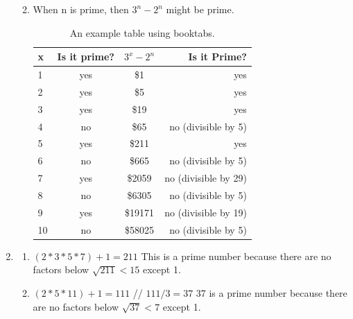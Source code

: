 \documentclass[12pt]{exam}
\begin{document}
\begin{enumerate}
\begin{enumerate}
\begin{table}[h]
\begin{tabular}{lccr}
        \bottomrule
    \end{tabular}
\end{table}



    \item When n is prime, then $3^n - 2^n$ might be prime.

    \begin{table}[h]
    \centering %
    \caption{An example table using booktabs.}
    \label{tab:example_table}
    
    \begin{tabular}{lccr} %
        \toprule
        \textbf{x} & \textbf{Is it prime?} & \textbf{$3^x - 2^n$} & \textbf{Is it Prime?}\\
        \midrule
        1            & yes               & \$1        & yes                  \\
        2            & yes               & \$5        & yes                  \\
        3            & yes               & \$19       & yes                  \\
        4            & no                & \$65       & no (divisible by 5)  \\
        5            & yes               & \$211      & yes                  \\
        6            & no                & \$665      & no (divisible by 5)  \\
        7            & yes               & \$2059     & no (divisible by 29) \\
        8            & no                & \$6305     & no (divisible by 5)  \\
        9            & yes               & \$19171    & no (divisible by 19) \\
        10           & no                & \$58025    & no (divisible by 5)  \\

        \bottomrule
    \end{tabular}
\end{table}
\end{enumerate}


\item \begin{enumerate}
    \item $(2*3*5*7) + 1 = 211$
    This is a prime number because there are no factors below $\sqrt{211} < 15$ except 1.
    \item $(2*5*11) + 1 = 111$ // $111 / 3 = 37$
    37 is a prime number because there are no factors below $\sqrt{37} < 7$ except 1.
\end{enumerate}


\end{enumerate}
\end{document}
